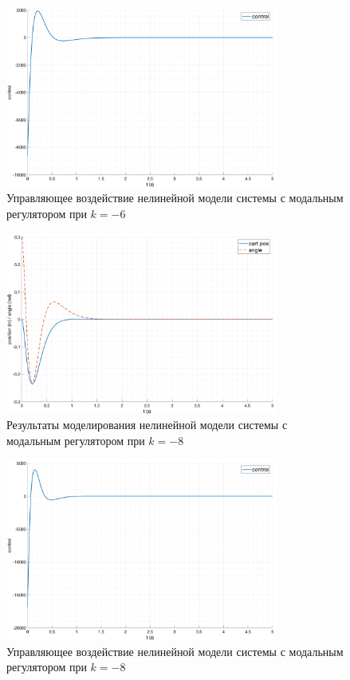 \begin{figure}[ht!]
    \centering
    \includegraphics[width=0.8\textwidth]{media/plots/modal_controllers/modal_control_u_2.png}
    \caption{Управляющее воздействие нелинейной модели системы с модальным регулятором при $k = -6$}
    \label{fig:modal_controlers_2_u}
\end{figure}
\begin{figure}[ht!]
    \centering
    \includegraphics[width=0.8\textwidth]{media/plots/modal_controllers/modal_control_out_3.png}
    \caption{Результаты моделирования нелинейной модели системы с модальным регулятором при $k = -8$}
    \label{fig:modal_controlers_3_out}
\end{figure}
\begin{figure}[ht!]
    \centering
    \includegraphics[width=0.8\textwidth]{media/plots/modal_controllers/modal_control_u_3.png}
    \caption{Управляющее воздействие нелинейной модели системы с модальным регулятором при $k = -8$}
    \label{fig:modal_controlers_3_u}
\end{figure}
